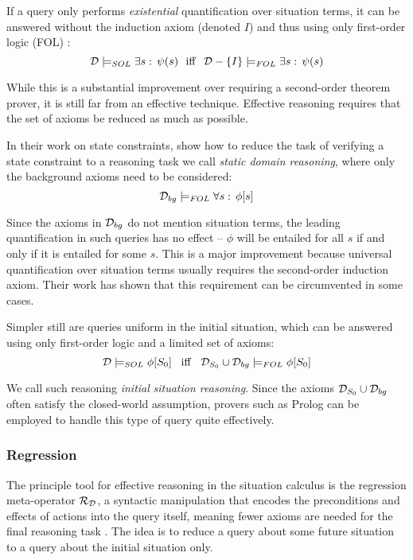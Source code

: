 If a query only performs \emph{existential} quantification over situation
terms, it can be answered without the induction axiom (denoted $I$)
and thus using only first-order logic (FOL) \citep{pirri99contributions_sitcalc}:\[
\mathcal{D}\models_{SOL}\exists s:\,\psi(s)\,\,\,\,\mathrm{iff}\,\,\,\,\mathcal{D}-\{I\}\models_{FOL}\exists s:\,\psi(s)\]


While this is a substantial improvement over requiring a second-order
theorem prover, it is still far from an effective technique. Effective
reasoning requires that the set of axioms be reduced as much as possible.

In their work on state constraints, \citet{Lin94-StateConstraints}
show how to reduce the task of verifying a state constraint to a reasoning
task we call \emph{static domain reasoning}, where only the background
axioms need to be considered:\[
\mathcal{D}_{bg}\models_{FOL}\forall s:\,\phi[s]\]


Since the axioms in $\mathcal{D}_{bg}$ do not mention situation terms, the
leading quantification in such queries has no effect -- $\phi$ will
be entailed for all $s$ if and only if it is entailed for some $s$.
This is a major improvement because universal quantification over
situation terms usually requires the second-order induction axiom.
Their work has shown that this requirement can be circumvented in
some cases.

Simpler still are queries uniform in the initial situation, which
can be answered using only first-order logic and a limited set of
axioms:\[
\mathcal{D}\models_{SOL}\phi[S_{0}]\,\,\,\,\,\mathit{\mathrm{iff}}\,\,\,\,\,\mathcal{D}_{S_{0}}\cup\mathcal{D}_{bg}\models_{FOL}\phi[S_{0}]\]


We call such reasoning \emph{initial} \emph{situation reasoning}.
Since the axioms $\mathcal{D}_{S_{0}}\cup\mathcal{D}_{bg}$ often satisfy the closed-world
assumption, provers such as Prolog can be employed to handle this
type of query quite effectively.


\subsubsection{Regression}

The principle tool for effective reasoning in the situation calculus
is the regression meta-operator $\mathcal{R}_{\mathcal{D}}$, a syntactic manipulation
that encodes the preconditions and effects of actions into the query
itself, meaning fewer axioms are needed for the final reasoning task
\citep{pirri99contributions_sitcalc}. The idea is to reduce a query
about some future situation to a query about the initial situation
only.

